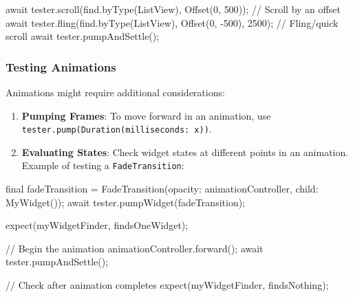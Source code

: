 \documentclass[
]{article}
\newenvironment{Shaded}{\begin{snugshade}}{\end{snugshade}}
\newcommand{\AttributeTok}[1]{\textcolor[rgb]{0.16,0.50,0.73}{#1}}
\newcommand{\CommentTok}[1]{\textcolor[rgb]{0.48,0.49,0.49}{#1}}
\newcommand{\DecValTok}[1]{\textcolor[rgb]{0.96,0.45,0.00}{#1}}
\newcommand{\NormalTok}[1]{\textcolor[rgb]{0.81,0.81,0.76}{#1}}
\newcommand{\OperatorTok}[1]{\textcolor[rgb]{0.81,0.81,0.76}{#1}}
\providecommand{\tightlist}{%
  \setlength{\itemsep}{0pt}\setlength{\parskip}{0pt}}
\begin{document}
\begin{Shaded}
\begin{Highlighting}[]
\AttributeTok{await}\NormalTok{ tester}\OperatorTok{.}\NormalTok{scroll(find}\OperatorTok{.}\NormalTok{byType(ListView)}\OperatorTok{,}\NormalTok{ Offset(}\DecValTok{0}\OperatorTok{,} \DecValTok{500}\NormalTok{));  }\CommentTok{// Scroll by an offset}
\AttributeTok{await}\NormalTok{ tester}\OperatorTok{.}\NormalTok{fling(find}\OperatorTok{.}\NormalTok{byType(ListView)}\OperatorTok{,}\NormalTok{ Offset(}\DecValTok{0}\OperatorTok{,} \OperatorTok{{-}}\DecValTok{500}\NormalTok{)}\OperatorTok{,} \DecValTok{2500}\NormalTok{);  }\CommentTok{// Fling/quick scroll}
\AttributeTok{await}\NormalTok{ tester}\OperatorTok{.}\NormalTok{pumpAndSettle();}
\end{Highlighting}
\end{Shaded}

\subsubsection{Testing Animations}\label{testing-animations}

Animations might require additional considerations:

\begin{enumerate}
\def\labelenumi{\arabic{enumi}.}
\tightlist
\item
  \textbf{Pumping Frames}: To move forward in an animation, use
  \texttt{tester.pump(Duration(milliseconds:\ x))}.
\item
  \textbf{Evaluating States}: Check widget states at different points in
  an animation. Example of testing a \texttt{FadeTransition}:
\end{enumerate}

\begin{Shaded}
\begin{Highlighting}[]
\AttributeTok{final}\NormalTok{ fadeTransition }\OperatorTok{=}\NormalTok{ FadeTransition(opacity}\OperatorTok{:}\NormalTok{ animationController}\OperatorTok{,}\NormalTok{ child}\OperatorTok{:}\NormalTok{ MyWidget());}
\AttributeTok{await}\NormalTok{ tester}\OperatorTok{.}\NormalTok{pumpWidget(fadeTransition);}

\NormalTok{expect(myWidgetFinder}\OperatorTok{,}\NormalTok{ findsOneWidget);}

\CommentTok{// Begin the animation}
\NormalTok{animationController}\OperatorTok{.}\NormalTok{forward();}
\AttributeTok{await}\NormalTok{ tester}\OperatorTok{.}\NormalTok{pumpAndSettle();}

\CommentTok{// Check after animation completes}
\NormalTok{expect(myWidgetFinder}\OperatorTok{,}\NormalTok{ findsNothing);}
\end{Highlighting}
\end{Shaded}
\end{document}
